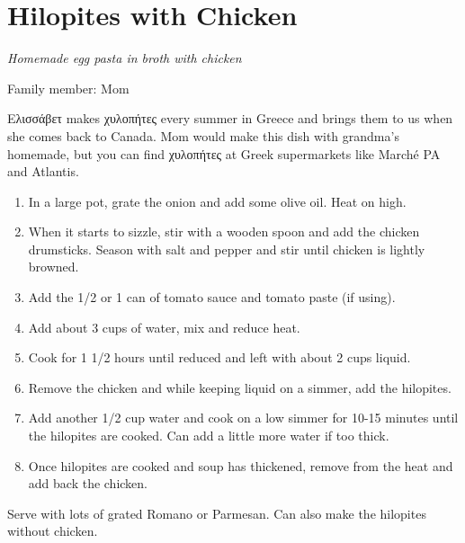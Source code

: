 \chapter{Hilopites with Chicken}
\label{ch:hilopites}


\textit{Homemade egg pasta in broth with chicken}

Family member: Mom

 \textgreek{Ελισσάβετ} makes \textgreek{χυλοπήτες} every summer in Greece and brings them to us when she comes back to Canada. Mom would make this dish with grandma's homemade, but you can find \textgreek{χυλοπήτες} at Greek supermarkets like Marché PA and Atlantis.

\begin{enumerate}
    \item In a large pot, grate the onion and add some olive oil. Heat on high.
    \item When it starts to sizzle, stir with a wooden spoon and add the chicken drumsticks. Season with salt and pepper and stir until chicken is lightly browned.
    \item Add the 1/2 or 1 can of tomato sauce and tomato paste (if using).
    \item Add about 3 cups of water, mix and reduce heat.
    \item Cook for 1 1/2 hours until reduced and left with about 2 cups liquid.
    \item Remove the chicken and while keeping liquid on a simmer, add the hilopites.
    \item Add another 1/2 cup water and cook on a low simmer for 10-15 minutes until the hilopites are cooked. Can add a little more water if too thick.
    \item Once hilopites are cooked and soup has thickened, remove from the heat and add back the chicken.
\end{enumerate}

Serve with lots of grated Romano or Parmesan. Can also make the hilopites without chicken.
